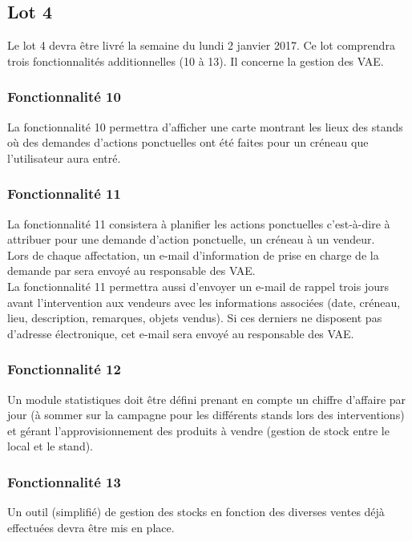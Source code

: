 \subsection{Lot 4}
Le lot 4 devra être livré la semaine du lundi 2 janvier 2017. Ce lot comprendra trois fonctionnalités additionnelles (10 à 13). Il concerne la gestion des VAE. 
\\

\subsubsection{Fonctionnalité 10}
La fonctionnalité 10 permettra d'afficher une carte montrant les lieux des stands où des demandes d'actions ponctuelles ont été faites pour un créneau que l'utilisateur aura entré.
\\

\subsubsection{Fonctionnalité 11}
La fonctionnalité 11 consistera à planifier les actions ponctuelles c'est-à-dire à attribuer pour une demande d'action ponctuelle, un créneau à un vendeur.\\
Lors de chaque affectation, un e-mail d'information de prise en charge de la demande par \nomClient{} sera envoyé au responsable des VAE.\\
La fonctionnalité 11 permettra aussi d'envoyer un e-mail de rappel trois jours avant l'intervention aux vendeurs avec les informations associées (date, créneau, lieu, description, remarques, objets vendus). Si ces derniers ne disposent pas d'adresse électronique, cet e-mail sera envoyé au responsable des VAE. 


\subsubsection{Fonctionnalité 12}
Un module statistiques doit être défini prenant en compte un chiffre d'affaire par jour (à sommer sur la campagne pour les différents stands lors des interventions) et gérant l'approvisionnement des produits à vendre (gestion de stock entre le local et le stand).
\\

\subsubsection{Fonctionnalité 13}
Un outil (simplifié) de gestion des stocks en fonction des diverses ventes déjà effectuées devra être mis en place.
\\
